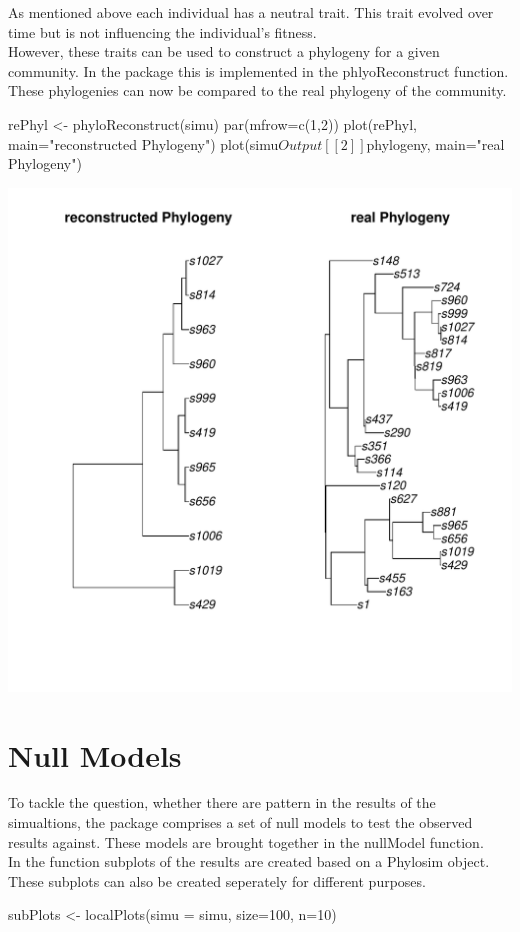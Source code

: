 \documentclass [a4paper]{tufte-book}\usepackage[]{graphicx}\usepackage[]{color}
\makeatletter
\def\maxwidth{ %
  \ifdim\Gin@nat@width>\linewidth
    \linewidth
  \else
    \Gin@nat@width
  \fi
}
\makeatother
\begin{document}
As mentioned above each individual has a neutral trait. This trait evolved over time but is not influencing the individual's fitness.\\
However, these traits can be used to construct a phylogeny for a given community.
In the package this is implemented in the phlyoReconstruct function. \\
These phylogenies can now be compared to the real phylogeny of the community.
\begin{Schunk}
\begin{Sinput}
rePhyl <- phyloReconstruct(simu)
par(mfrow=c(1,2))
plot(rePhyl, main="reconstructed Phylogeny")
plot(simu$Output[[2]]$phylogeny, main="real Phylogeny")
\end{Sinput}

\includegraphics[width=\maxwidth]{figure/unnamed-chunk-14-1} \end{Schunk}


\chapter{Null Models}

To tackle the question, whether there are pattern in the results of the 
simualtions, the package comprises a set of null models to test the observed results
against. These models are brought together in the nullModel function.\\
In the function subplots of the results are created based on a Phylosim object.
These subplots can also be created seperately for different purposes.
\begin{Schunk}
\begin{Sinput}
subPlots <- localPlots(simu = simu, size=100, n=10)
\end{Sinput}
\end{Schunk}
\end{document}

